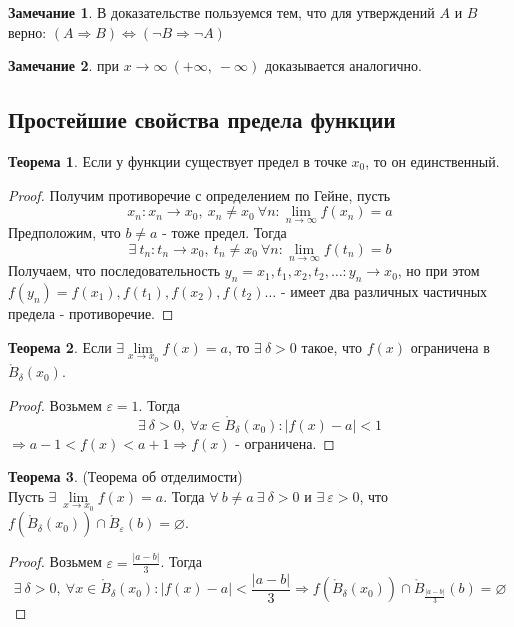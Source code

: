 \documentclass[a4paper, 12pt]{article}
\newcommand{\Bo}{\mathring{B}}
\renewcommand{\epsilon}{\varepsilon}
\renewcommand{\emptyset}{\varnothing}
\newcommand{\lims}{\lim\limits_{n\to \infty}}
\theoremstyle{definition}
\newtheorem*{theorem}{Теорема}
\newtheorem*{comm}{Замечание}
\begin{document}
        \begin{comm}
            В доказательстве пользуемся тем, что для утверждений $A$ и $B$ верно: $(A\Rightarrow B) \Leftrightarrow (\lnot B\Rightarrow \lnot A)$
        \end{comm} 
        \begin{comm}
            при $x\to \infty\ (+\infty,\ -\infty)$ доказывается аналогично.
        \end{comm}
    \subsection{Простейшие свойства предела функции}
        \begin{theorem}
            Если у функции существует предел в точке $x_0$, то он единственный.
        \end{theorem}
        \begin{proof}
            Получим противоречие с определением по Гейне, пусть 
            \[x_n: x_n\to x_0,\ x_n\ne x_0\ \forall n: \lims f(x_n)=a\] 
            Предположим, что $b\ne a$ - тоже предел. Тогда 
            \[\exists\ t_n: t_n\to x_0,\ t_n\ne x_0\ \forall n: \lims f(t_n)=b\] 
            Получаем, что последовательность $y_n = x_1,t_1,x_2,t_2,\dots: y_n\to x_0$, но при этом $f(y_n)= f(x_1),f(t_1),f(x_2),f(t_2)\dots$ - имеет два различных частичных предела - противоречие.
        \end{proof}
        \begin{theorem}
            Если $\exists \lim\limits_{x\to x_0}f(x)=a$, то $\exists\ \delta>0$ такое, что $f(x)$ ограничена в $\Bo_{\delta}(x_0)$.
        \end{theorem} 
        \begin{proof}
            Возьмем $\epsilon = 1$. Тогда
            \[\exists\ \delta>0,\ \forall x\in \Bo_{\delta}(x_0): |f(x)-a|<1\]
            $\Rightarrow a-1<f(x)<a+1 \Rightarrow f(x)$ - ограничена.
        \end{proof}
        \begin{theorem} (Теорема об отделимости)\\
            Пусть $\exists\ \lim\limits_{x\to x_0}f(x)=a$. Тогда $\forall\ b\ne a\ \exists\ \delta>0$ и $\exists\ \epsilon>0$, что $f(\Bo_{\delta}(x_0))\cap \Bo_\epsilon(b)=\emptyset$. 
        \end{theorem}  
        \begin{proof}
            Возьмем $\epsilon=\frac{|a-b|}{3}$. Тогда
            \[\exists\ \delta>0,\ \forall x\in \Bo_{\delta}(x_0): |f(x)-a|<\frac{|a-b|}{3} \Rightarrow f(\Bo_{\delta}(x_0))\cap\Bo_{\frac{|a-b|}{3}}(b)=\emptyset\]
        \end{proof} 
\end{document}
